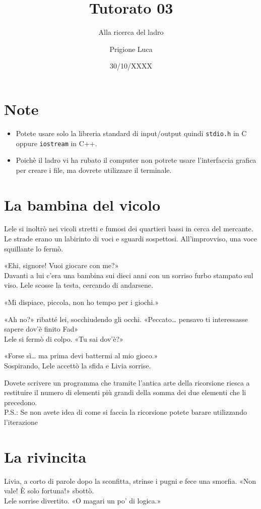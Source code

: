 \documentclass[a4paper]{article}
\title{Tutorato 03}
\subtitle{Alla ricerca del ladro}
\author{Prigione Luca}
\date{30/10/XXXX}
\begin{document}
\pagestyle{empty}

\maketitle

\section*{Note}
  \begin{itemize}
    \item Potete usare solo la libreria standard di input/output quindi \texttt{stdio.h} in C oppure \texttt{iostream} in C++.
    \item Poichè il ladro vi ha rubato il computer non potrete usare l'interfaccia grafica per creare i file, ma dovrete utilizzare il terminale.
  \end{itemize}

\section*{La bambina del vicolo}
Lele si inoltrò nei vicoli stretti e fumosi dei quartieri bassi in cerca del mercante.
Le strade erano un labirinto di voci e sguardi sospettosi.
All'improvviso, una voce squillante lo fermò.

«Ehi, signore! Vuoi giocare con me?»\\
Davanti a lui c'era una bambina sui dieci anni con un sorriso furbo stampato sul viso.
Lele scosse la testa, cercando di andarsene.

«Mi dispiace, piccola, non ho tempo per i giochi.»

«Ah no?» ribatté lei, socchiudendo gli occhi. «Peccato… pensavo ti interessasse sapere dov'è finito Fad»\\
Lele si fermò di colpo. «Tu sai dov'è?»

«Forse sì… ma prima devi battermi al mio gioco.»\\
Sospirando, Lele accettò la sfida e Livia sorrise.

Dovete scrivere un programma che tramite l'antica arte della ricorsione riesca a restituire il numero di elementi più grandi della somma dei due elementi che li precedono.\\
P.S.: Se non avete idea di come si faccia la ricorsione potete barare utilizzando l'iterazione

\section*{La rivincita}
Livia, a corto di parole dopo la sconfitta, strinse i pugni e fece una smorfia.
«Non vale! È solo fortuna!» sbottò.\\
Lele sorrise divertito. «O magari un po' di logica.»
\end{document}
